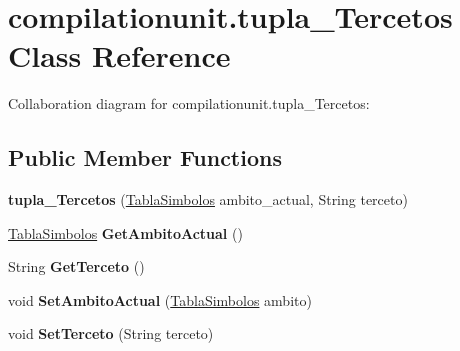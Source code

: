 \hypertarget{classcompilationunit_1_1tupla___tercetos}{
\section{compilationunit.tupla\_\-Tercetos Class Reference}
\label{classcompilationunit_1_1tupla___tercetos}
}


Collaboration diagram for compilationunit.tupla\_\-Tercetos:
\subsection*{Public Member Functions}
\begin{DoxyCompactItemize}
\item 
\hypertarget{classcompilationunit_1_1tupla___tercetos_aacf03073ed504f4eaba6243b5f8550c3}{
{\bfseries tupla\_\-Tercetos} (\hyperlink{classcompilationunit_1_1_tabla_simbolos}{TablaSimbolos} ambito\_\-actual, String terceto)}
\label{classcompilationunit_1_1tupla___tercetos_aacf03073ed504f4eaba6243b5f8550c3}

\item 
\hypertarget{classcompilationunit_1_1tupla___tercetos_a92cb26a621ba202e71d8a2047ef4363e}{
\hyperlink{classcompilationunit_1_1_tabla_simbolos}{TablaSimbolos} {\bfseries GetAmbitoActual} ()}
\label{classcompilationunit_1_1tupla___tercetos_a92cb26a621ba202e71d8a2047ef4363e}

\item 
\hypertarget{classcompilationunit_1_1tupla___tercetos_aacbe978aa8e0c599a02fbfc92bcfe306}{
String {\bfseries GetTerceto} ()}
\label{classcompilationunit_1_1tupla___tercetos_aacbe978aa8e0c599a02fbfc92bcfe306}

\item 
\hypertarget{classcompilationunit_1_1tupla___tercetos_ad6fd283c7244070c8057a596e724b77c}{
void {\bfseries SetAmbitoActual} (\hyperlink{classcompilationunit_1_1_tabla_simbolos}{TablaSimbolos} ambito)}
\label{classcompilationunit_1_1tupla___tercetos_ad6fd283c7244070c8057a596e724b77c}

\item 
\hypertarget{classcompilationunit_1_1tupla___tercetos_a27dec7431d06b77a6124d95c141488bb}{
void {\bfseries SetTerceto} (String terceto)}
\label{classcompilationunit_1_1tupla___tercetos_a27dec7431d06b77a6124d95c141488bb}

\end{DoxyCompactItemize}
